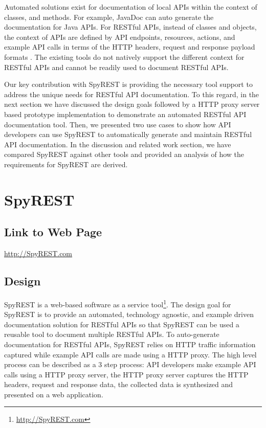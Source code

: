 \documentclass[conference]{IEEEtran}
\begin{document}
Automated solutions exist for documentation of local APIs within the context of classes, and methods. For example, JavaDoc can auto generate the documentation for Java APIs. For RESTful APIs, instead of classes and objects, the context of APIs are defined by API endpoints, resources, actions, and example API calls in terms of the HTTP headers, request and response payload formats \cite{Danielsen_validation}. The existing tools do not natively support the different context for RESTful APIs and cannot be readily used to document RESTful APIs.

Our key contribution with SpyREST is providing the necessary tool support to address the unique needs for RESTful API documentation. To this regard, in the next section we have discussed the design goals followed by a HTTP proxy server based prototype implementation to demonstrate an automated RESTful API documentation tool. Then, we presented two use cases to show how API developers can use SpyREST to automatically generate and maintain RESTful API documentation. In the discussion and related work section, we have compared SpyREST against other tools and provided an analysis of how the requirements for SpyREST are derived.

\section{SpyREST}

\subsection{Link to Web Page}
\url{http://SpyREST.com}

\subsection{Design} %
\label{sub:how_it_works}

SpyREST is a web-based software as a service tool\footnote{\url{http://SpyREST.com}}. The design goal for SpyREST is to provide an automated, technology agnostic, and example driven documentation solution for RESTful APIs so that SpyREST can be used a reusable tool to document multiple RESTful APIs. To auto-generate documentation for RESTful APIs, SpyREST relies on HTTP traffic information captured while example API calls are made using a HTTP proxy. The high level process can be described as a 3 step process: API developers make example API calls using a HTTP proxy server, the HTTP proxy server captures the HTTP headers, request and response data, the collected data is synthesized and presented on a web application.
\end{document}
